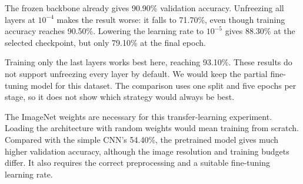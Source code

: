 \documentclass[11pt,a4paper]{article}
\begin{document}
The frozen backbone already gives 90.90\% validation accuracy. Unfreezing all
layers at $10^{-4}$ makes the result worse: it falls to 71.70\%, even though
training accuracy reaches 90.50\%. Lowering the learning rate to $10^{-5}$
gives 88.30\% at the selected checkpoint, but only 79.10\% at the final epoch.

Training only the last layers works best here, reaching 93.10\%. These results
do not support unfreezing every layer by default. We would keep the partial
fine-tuning model for this dataset. The comparison uses one split and five
epochs per stage, so it does not show which strategy would always be best.

The ImageNet weights are necessary for this transfer-learning experiment.
Loading the architecture with random weights would mean training from scratch.
Compared with the simple CNN's 54.40\%, the pretrained model gives much higher
validation accuracy, although the image resolution and training budgets differ.
It also requires the correct preprocessing and a suitable fine-tuning learning
rate.
\end{document}
